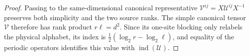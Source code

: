 \begin{proof}\leanok
    Passing to the same-dimensional canonical representative
    $\mathcal V^{ij}=X\mathcal U^{ij}X^{-1}$ preserves both simplicity and
    the two source ranks. The simple canonical tensor $\mathcal V$ therefore
    has rank product $r\ell=d^2$. Since its one-site blocking only relabels
    the physical alphabet, its index is
    $\frac12(\log_2 r-\log_2\ell)$, and equality of the periodic operators
    identifies this value with $\operatorname{ind}(\mathcal U)$.
\end{proof}
